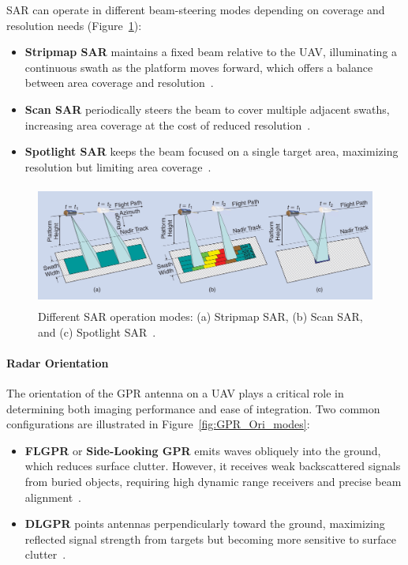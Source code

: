 \gls{SAR} can operate in different beam-steering modes depending on coverage and resolution needs (Figure~\ref{fig:sar_modes}):

\begin{itemize}
    \item \textbf{Stripmap \gls{SAR}} maintains a fixed beam relative to the \gls{UAV}, illuminating a continuous swath as the platform moves forward, which offers a balance between area coverage and resolution~\cite{moreira2013tutorial}.
    \item \textbf{Scan \gls{SAR}} periodically steers the beam to cover multiple adjacent swaths, increasing area coverage at the cost of reduced resolution~\cite{moreira2013tutorial}.
    \item \textbf{Spotlight \gls{SAR}} keeps the beam focused on a single target area, maximizing resolution but limiting area coverage~\cite{moreira2013tutorial}.
\end{itemize}

\begin{figure}[H]
    \centering
    \includegraphics[height=4cm]{figs/Huirui/sar_modes.png}
    \caption{Different SAR operation modes: (a) Stripmap SAR, (b) Scan SAR, and (c) Spotlight SAR~\cite{moreira2013tutorial}.}
    \label{fig:sar_modes}
\end{figure}


\paragraph{Radar Orientation}

The orientation of the \gls{GPR} antenna on a \gls{UAV} plays a critical role in determining both imaging performance and ease of integration. Two common configurations are illustrated in Figure~\ref{fig:GPR_Ori_modes}:

\begin{itemize}
    \item \textbf{\gls{FLGPR}} or \textbf{Side-Looking \gls{GPR}} emits waves obliquely into the ground, which reduces surface clutter. However, it receives weak backscattered signals from buried objects, requiring high dynamic range receivers and precise beam alignment~\cite{garcia2020airborne}.

    \item \textbf{\gls{DLGPR}} points antennas perpendicularly toward the ground, maximizing reflected signal strength from targets but becoming more sensitive to surface clutter~\cite{garcia2020airborne}.
\end{itemize}

